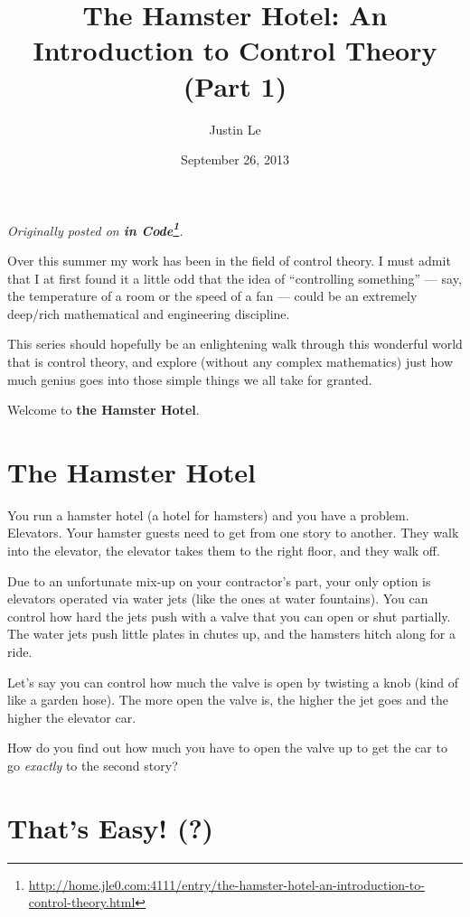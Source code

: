 \documentclass[]{article}
\title{The Hamster Hotel: An Introduction to Control Theory (Part 1)}
\author{Justin Le}
\date{September 26, 2013}
\renewcommand{\href}[2]{#2\footnote{\url{#1}}}
\begin{document}
\maketitle

\emph{Originally posted on
\textbf{\href{http://home.jle0.com:4111/entry/the-hamster-hotel-an-introduction-to-control-theory.html}{in
Code}}.}

Over this summer my work has been in the field of control theory. I must
admit that I at first found it a little odd that the idea of
``controlling something'' --- say, the temperature of a room or the
speed of a fan --- could be an extremely deep/rich mathematical and
engineering discipline.

This series should hopefully be an enlightening walk through this
wonderful world that is control theory, and explore (without any complex
mathematics) just how much genius goes into those simple things we all
take for granted.

Welcome to \textbf{the Hamster Hotel}.

\section{The Hamster Hotel}\label{the-hamster-hotel}

You run a hamster hotel (a hotel for hamsters) and you have a problem.
Elevators. Your hamster guests need to get from one story to another.
They walk into the elevator, the elevator takes them to the right floor,
and they walk off.

Due to an unfortunate mix-up on your contractor's part, your only option
is elevators operated via water jets (like the ones at water fountains).
You can control how hard the jets push with a valve that you can open or
shut partially. The water jets push little plates in chutes up, and the
hamsters hitch along for a ride.

Let's say you can control how much the valve is open by twisting a knob
(kind of like a garden hose). The more open the valve is, the higher the
jet goes and the higher the elevator car.

How do you find out how much you have to open the valve up to get the
car to go \emph{exactly} to the second story?

\section{That's Easy! (?)}\label{thats-easy}
\end{document}
